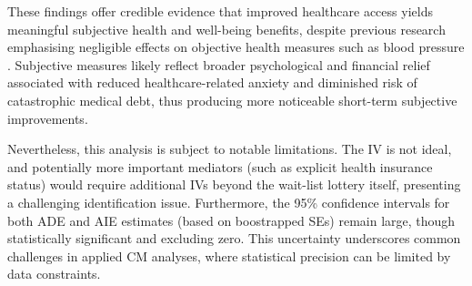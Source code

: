 These findings offer credible evidence that improved healthcare access yields meaningful subjective health and well-being benefits, despite previous research emphasising negligible effects on objective health measures such as blood pressure \citep{baicker2013oregon}.
Subjective measures likely reflect broader psychological and financial relief associated with reduced healthcare-related anxiety and diminished risk of catastrophic medical debt, thus producing more noticeable short-term subjective improvements.

Nevertheless, this analysis is subject to notable limitations.
The IV is not ideal, and potentially more important mediators (such as explicit health insurance status) would require additional IVs beyond the wait-list lottery itself, presenting a challenging identification issue.
Furthermore, the 95\% confidence intervals for both ADE and AIE estimates (based on boostrapped SEs) remain large, though statistically significant and excluding zero.
This uncertainty underscores common challenges in applied CM analyses, where statistical precision can be limited by data constraints.
